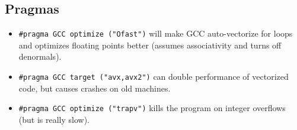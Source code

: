 	\subsection{Pragmas}
		\begin{itemize}
			\item \lstinline{#pragma GCC optimize ("Ofast")} will make GCC auto-vectorize for loops and optimizes floating points better (assumes associativity and turns off denormals).
			\item \lstinline{#pragma GCC target ("avx,avx2")} can double performance of vectorized code, but causes crashes on old machines.
			\item \lstinline{#pragma GCC optimize ("trapv")} kills the program on integer overflows (but is really slow).
		\end{itemize}
